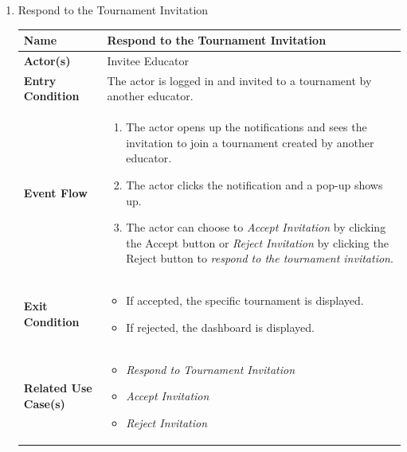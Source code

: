 \begin{enumerate}
\item Respond to the Tournament Invitation
\begin{center}
    \begin{tabular}{ | m{10em} | m{10cm}| } 
      \hline
      \textbf{Name} & Respond to the Tournament Invitation  \\ 
      \hline
      \textbf{Actor(s)} & Invitee Educator \\ 
      \hline
      \textbf{Entry Condition} & The actor is logged in and invited to a tournament by another educator.  \\ 
      \hline
      \textbf{Event Flow} & 
          \begin{enumerate}[(1)]
              \item The actor opens up the notifications and sees the invitation to join a tournament created by another educator.
              \item The actor clicks the notification and a pop-up shows up.
              \item The actor can choose to \textit{Accept Invitation} by clicking the Accept button or \textit{Reject Invitation} by clicking the Reject button to \textit{respond to the tournament invitation}.
          \end{enumerate}
      \\ 
      \hline
      \textbf{Exit Condition} & 
      \begin{itemize}
          \item If accepted, the specific tournament is displayed.
          \item If rejected, the dashboard is displayed.
      \end{itemize}\\ 
      \hline
      \textbf{Related Use Case(s)} & 
      \begin{itemize}
          \item \textit{Respond to Tournament Invitation}
          \item \textit{Accept Invitation}
          \item \textit{Reject Invitation}
      \end{itemize}
          \\ 
      \hline
    \end{tabular}
     \label{tbl:uc23}
\end{center}


\newpage



\end{enumerate}

